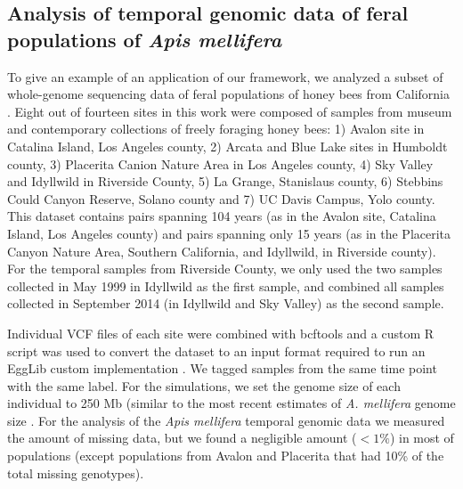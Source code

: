 \documentclass[a4paper, 12pt]{article}
\begin{document}
\subsection*{Analysis of temporal genomic data of feral populations of \textit{Apis mellifera}}

To give an example of an application of our framework, we analyzed a subset of whole-genome sequencing data of feral populations of honey bees from California \citep{Cridland:2018fx}. Eight out of fourteen sites in this work were composed of samples from museum and contemporary collections of freely foraging honey bees: 1) Avalon site in Catalina Island, Los Angeles county, 2) Arcata and Blue Lake sites in Humboldt county, 3) Placerita Canion Nature Area in Los Angeles county, 4) Sky Valley and Idyllwild in Riverside County, 5) La Grange, Stanislaus county, 6) Stebbins Could Canyon Reserve, Solano county and 7) UC Davis Campus, Yolo county. This dataset contains pairs spanning 104 years (as in the Avalon site, Catalina Island, Los Angeles county) and pairs spanning only 15 years (as in the Placerita Canyon Nature Area, Southern California, and Idyllwild, in Riverside county). For the temporal samples from Riverside County, we only used the two samples collected in May 1999 in Idyllwild as the first sample, and combined all samples collected in September 2014 (in Idyllwild and Sky Valley) as the second sample.

Individual VCF files of each site were combined with bcftools \citep{Li:2011kr} and a custom R script was used to convert the dataset to an input format required to run an EggLib custom implementation \citep[in][]{Pavinato:2021}. We tagged samples from the same time point with the same label. For the simulations, we set the genome size of each individual to 250 Mb (similar to the most recent estimates of \textit{A. mellifera} genome size \citep{Elsik:2014hf}. For the analysis of the \textit{Apis mellifera} temporal genomic data we measured the amount of missing data, but we found a negligible amount ($< 1\%$) in most of populations (except populations from Avalon and Placerita that had 10\% of the total missing genotypes).
\end{document}
